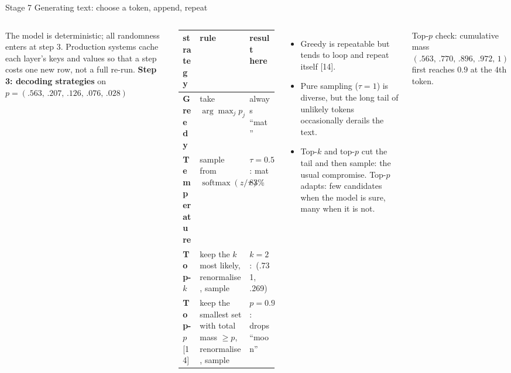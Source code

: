 \documentclass[aspectratio=169,10pt]{beamer}
\DeclareMathOperator{\softmax}{softmax}
\renewcommand{\cite}[1]{{\scriptsize\color{cTok}[#1]}}
\begin{document}
\begin{frame}{Stage 7 \textbullet{} Generating text: choose a token, append, repeat}
\begin{columns}[T,onlytextwidth]
\raggedright\vspace{1.5mm}
{\footnotesize The model is deterministic; all randomness enters at step 3. Production systems
cache each layer's keys and values so that a step costs one new row, not a full re-run.}
\small
\textbf{Step 3: decoding strategies} on $p=(.563,\,.207,\,.126,\,.076,\,.028)$

\vspace{1mm}
{\footnotesize
\renewcommand{\arraystretch}{1.25}
\begin{tabular}{@{}p{18mm}>{\raggedright}p{36mm}>{\raggedright\arraybackslash}p{28mm}@{}}
\toprule
strategy & rule & result here\\
\midrule
\textbf{Greedy} & take $\arg\max_j p_j$ & always ``mat''\\
\textbf{Temperature} & sample from $\softmax(z/\tau)$ & $\tau{=}0.5$: mat 83\%\\
\textbf{Top-$k$} & keep the $k$ most likely, renormalise, sample & $k{=}2$:\ (.731, .269)\\
\textbf{Top-$p$} \cite{14} & keep the smallest set with total mass $\ge p$, renormalise, sample
   & $p{=}0.9$: drops ``moon''\\
\bottomrule
\end{tabular}}

\vspace{1.5mm}
\begin{itemize}\footnotesize
  \item Greedy is repeatable but tends to loop and repeat itself \cite{14}.
  \item Pure sampling ($\tau=1$) is diverse, but the long tail of unlikely tokens occasionally
        derails the text.
  \item Top-$k$ and top-$p$ cut the tail and then sample: the usual compromise.
        Top-$p$ adapts: few candidates when the model is sure, many when it is not.
\end{itemize}
{\footnotesize Top-$p$ check: cumulative mass $(.563,\,.770,\,.896,\,.972,\,1)$ first reaches $0.9$ at the 4th token.}
\end{columns}
\end{frame}
\end{document}
